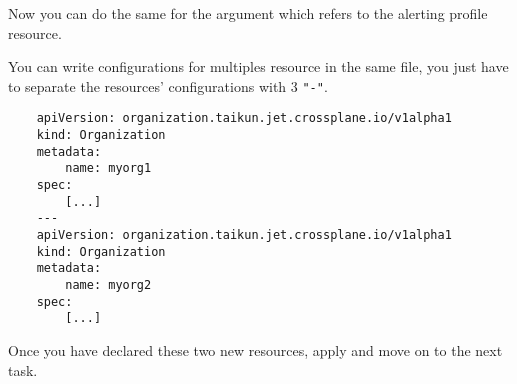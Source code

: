 Now you can do the same for the argument which refers to the alerting profile resource.\\

\begin{tip}
You can write configurations for multiples resource in the same file, you just have to separate the resources' configurations with 3 \texttt{"-"}.
\begin{verbatim}
    apiVersion: organization.taikun.jet.crossplane.io/v1alpha1
    kind: Organization
    metadata:
        name: myorg1
    spec:
        [...]
    ---
    apiVersion: organization.taikun.jet.crossplane.io/v1alpha1
    kind: Organization
    metadata:
        name: myorg2
    spec:
        [...]
\end{verbatim}
\end{tip}
Once you have declared these two new resources, apply and move on to the next task.
